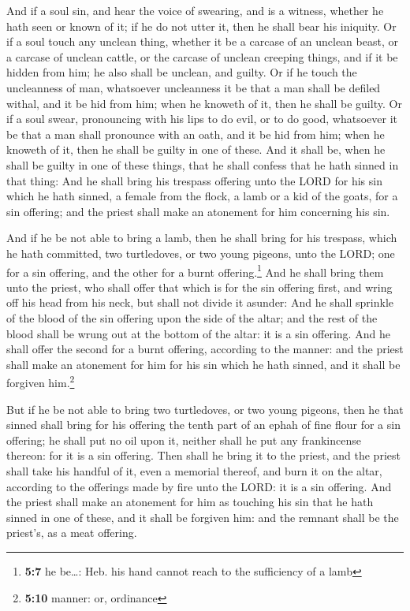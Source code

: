  And if a soul sin, and hear the voice of swearing, and is
a witness, whether he hath seen or known of it; if he do not utter it,
then he shall bear his iniquity.  Or if a soul touch any
unclean thing, whether it be a carcase of an unclean beast, or a carcase
of unclean cattle, or the carcase of unclean creeping things, and if it
be hidden from him; he also shall be unclean, and guilty. 
Or if he touch the uncleanness of man, whatsoever uncleanness it be that
a man shall be defiled withal, and it be hid from him; when he knoweth
of it, then he shall be guilty.  Or if a soul swear,
pronouncing with his lips to do evil, or to do good, whatsoever it be
that a man shall pronounce with an oath, and it be hid from him; when he
knoweth of it, then he shall be guilty in one of these. 
And it shall be, when he shall be guilty in one of these things, that he
shall confess that he hath sinned in that thing:  And he
shall bring his trespass offering unto the LORD for his sin which he
hath sinned, a female from the flock, a lamb or a kid of the goats, for
a sin offering; and the priest shall make an atonement for him
concerning his sin.

 And if he be not able to bring a lamb, then he shall
bring for his trespass, which he hath committed, two turtledoves, or two
young pigeons, unto the LORD; one for a sin offering, and the other for
a burnt offering.\footnote{\textbf{5:7} he be\ldots: Heb. his hand
  cannot reach to the sufficiency of a lamb}  And he shall
bring them unto the priest, who shall offer that which is for the sin
offering first, and wring off his head from his neck, but shall not
divide it asunder:  And he shall sprinkle of the blood of
the sin offering upon the side of the altar; and the rest of the blood
shall be wrung out at the bottom of the altar: it is a sin offering.
 And he shall offer the second for a burnt offering,
according to the manner: and the priest shall make an atonement for him
for his sin which he hath sinned, and it shall be forgiven
him.\footnote{\textbf{5:10} manner: or, ordinance}

 But if he be not able to bring two turtledoves, or two
young pigeons, then he that sinned shall bring for his offering the
tenth part of an ephah of fine flour for a sin offering; he shall put no
oil upon it, neither shall he put any frankincense thereon: for it is a
sin offering.  Then shall he bring it to the priest, and
the priest shall take his handful of it, even a memorial thereof, and
burn it on the altar, according to the offerings made by fire unto the
LORD: it is a sin offering.  And the priest shall make an
atonement for him as touching his sin that he hath sinned in one of
these, and it shall be forgiven him: and the remnant shall be the
priest's, as a meat offering.

